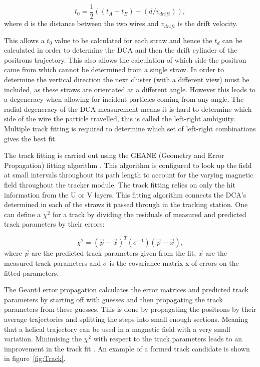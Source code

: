 \begin{equation}
t_{0} = \frac{1}{2}((t_{A} + t_{B})-(d/v_{drift})),
\end{equation}
where d is the distance between the two wires and $v_{drift}$ is the drift velocity.

This allows a $t_{0}$ value to be calculated for each straw and hence the $t_{d}$ can be calculated in order to determine the DCA and then the drift cylinder of the positrons trajectory. This also allows the calculation of which side the positron came from which cannot be determined from a single straw. In order to determine the vertical direction the next cluster (with a different view) must be included, as these straws are orientated at a different angle. However this leads to a degeneracy when allowing for incident particles coming from any angle. The radial degeneracy of the DCA measurement means it is hard to determine which side of the wire the particle travelled, this is called the left-right ambiguity. Multiple track fitting is required to determine which set of left-right combinations gives the best fit. 

The track fitting is carried out using the GEANE (Geometry and Error Propagation) fitting algorithm \cite{geane}. This algorithm is configured to look up the field at small intervals throughout its path length to account for the varying magnetic field throughout the tracker module. The track fitting relies on only the hit information from the U or V layers. This fitting algorithm connects the DCA's determined in each of the straws it passed through in the tracking station. One can define a $\chi^{2}$ for a track by dividing the residuals of measured and predicted track parameters by their errors:

\begin{equation}
\chi^{2}= (\vec{p}-\vec{x})^{T}(\sigma^{-1})(\vec{p}-\vec{x}),
\end{equation}
\noindent
where $\vec{p}$ are the predicted track parameters given from the fit, $\vec{x}$ are the measured track parameters and $\sigma$ is the covariance matrix x of errors on the fitted parameters.

The Geant4 error propagation calculates the error matrices and predicted track parameters by starting off with guesses and then propagating the track parameters from these guesses. This is done by propagating the positrons by their average trajectories and splitting the steps into small enough sections. Meaning that a helical trajectory can be used in a magnetic field with a very small variation. Minimising the $\chi^{2}$ with respect to the track parameters leads to an improvement in the track fit \cite{geanefitting}. An example of a formed track candidate is shown in figure~\ref{fig:Track}.

